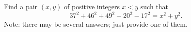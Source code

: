 Find a pair $\left(x,y\right)$ of positive integers $x<y$ such that $$37^2+46^2+49^2-20^2-17^2=x^2+y^2.$$ Note: there may be several answers; just provide one of them.